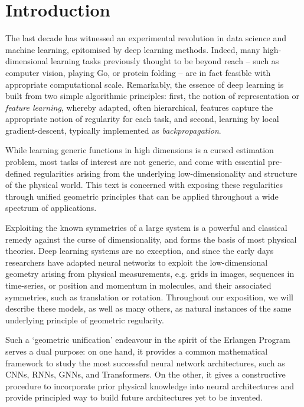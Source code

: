 
\section{Introduction}                %

The last decade has witnessed an experimental revolution in data science and machine learning, epitomised by deep learning methods. Indeed, many high-dimensional learning tasks previously thought to be beyond reach -- such as computer vision, playing Go, or protein folding -- are in fact feasible with appropriate computational scale.  
%
 Remarkably, the essence of deep learning is built from two simple algorithmic principles: 
 first, the notion of representation or \emph{feature learning}, whereby adapted, often hierarchical, features  capture the appropriate notion of regularity for each task, and second, learning by local gradient-descent, typically implemented as {\em backpropagation}. %

While learning generic functions in high dimensions is a cursed estimation problem, most tasks of interest are not generic, and come with essential pre-defined regularities arising from the underlying low-dimensionality and structure of the physical world. This text is concerned with exposing these regularities through unified geometric principles that can be applied throughout a wide spectrum of applications. 

Exploiting the known symmetries of a large system is a powerful and classical remedy against the curse of dimensionality, and forms the basis of most physical theories. Deep learning systems are no exception, and since the early days researchers have adapted neural networks to exploit the low-dimensional geometry arising from physical measurements, e.g. grids in images, sequences in time-series, or position and momentum in molecules, and their associated symmetries, such as translation or rotation. 
Throughout our exposition, we will describe these models, as well as many others, as natural instances of the same underlying principle of geometric regularity.%

Such a `geometric unification' endeavour 
in the spirit of the Erlangen Program 
serves a dual purpose: on one hand, it provides a common mathematical framework to study the most successful neural network architectures, such as CNNs, RNNs, GNNs, 
and Transformers. On the other, it gives a constructive procedure to incorporate prior physical knowledge into neural architectures %
and provide principled way to build future architectures yet to be invented.  

